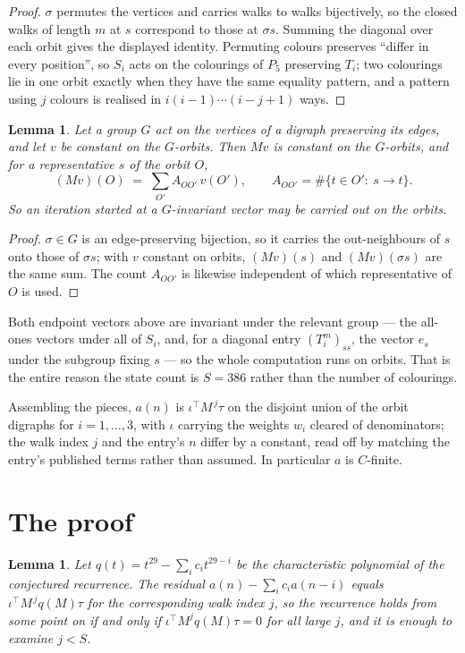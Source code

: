 \documentclass[11pt,a4paper]{article}
\theoremstyle{plain}
\newtheorem{lemma}[theorem]{Lemma}
\theoremstyle{definition}
\begin{document}
\begin{proof}
$\sigma$ permutes the vertices and carries walks to walks bijectively, so the closed walks of
length $m$ at $s$ correspond to those at $\sigma s$. Summing the diagonal over each orbit
gives the displayed identity. Permuting colours preserves ``differ in every position'', so
$S_i$ acts on the colourings of $P_{5}$ preserving $T_i$; two colourings lie in one orbit
exactly when they have the same equality pattern, and a pattern using $j$ colours is realised
in $i(i-1)\cdots(i-j+1)$ ways.
\end{proof}

\begin{lemma}\label{lem:lump}
Let a group $G$ act on the vertices of a digraph preserving its edges, and let $v$ be constant
on the $G$-orbits. Then $Mv$ is constant on the $G$-orbits, and for a representative $s$ of
the orbit $O$,
\[
(Mv)(O)\;=\;\sum_{O'}A_{OO'}\,v(O'),\qquad
A_{OO'}=\#\{t\in O':\ s\to t\} .
\]
So an iteration started at a $G$-invariant vector may be carried out on the orbits.
\end{lemma}

\begin{proof}
$\sigma\in G$ is an edge-preserving bijection, so it carries the out-neighbours of $s$ onto
those of $\sigma s$; with $v$ constant on orbits, $(Mv)(s)$ and $(Mv)(\sigma s)$ are the same
sum. The count $A_{OO'}$ is likewise independent of which representative of $O$ is used.
\end{proof}

Both endpoint vectors above are invariant under the relevant group --- the all-ones vectors
under all of $S_i$, and, for a diagonal entry $(T_i^m)_{ss}$, the vector $e_s$ under the
subgroup fixing $s$ --- so the whole computation runs on orbits. That is the entire reason the
state count is $S=386$ rather than the number of colourings.

Assembling the pieces, $a(n)$ is $\iota^{\!\top}M^{\,j}\tau$ on the disjoint union of the
orbit digraphs for $i=1,\dots,3$, with $\iota$ carrying the weights $w_i$ cleared of
denominators; the walk index $j$ and the entry's $n$ differ by a constant, read off by
matching the entry's published terms rather than assumed. In particular $a$ is $C$-finite.

\section{The proof}

\begin{lemma}\label{lem:crit}
Let $q(t)=t^{29}-\sum_i c_it^{29-i}$ be the characteristic polynomial of the
conjectured recurrence. The residual $a(n)-\sum_ic_ia(n-i)$ equals
$\iota^{\!\top}M^{\,j}q(M)\tau$ for the corresponding walk index $j$, so the recurrence
holds from some point on if and only if $\iota^{\!\top}M^{j}q(M)\tau=0$ for all large $j$,
and it is enough to examine $j<S$.
\end{lemma}
\end{document}
